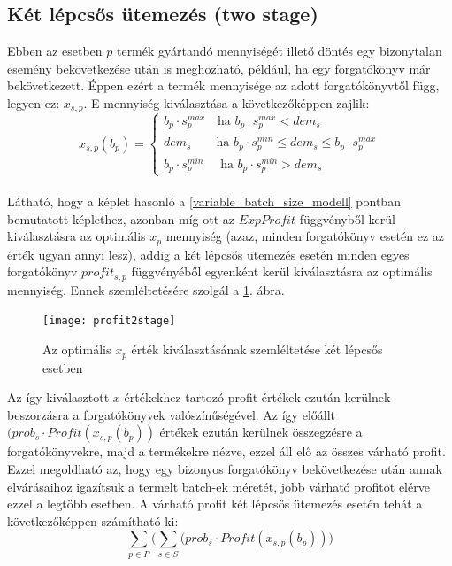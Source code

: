 \subsection{Két lépcsős ütemezés (two stage)} \label{TwoStage}
Ebben az esetben $p$ termék gyártandó mennyiségét illető döntés egy bizonytalan esemény bekövetkezése után is meghozható, például, ha egy forgatókönyv már bekövetkezett.
Éppen ezért a termék mennyisége az adott forgatókönyvtől függ, legyen ez: $x_{s,p}$. E mennyiség kiválasztása a következőképpen zajlik:
\begin{equation*}
x_{s,p}(b_p)= \begin{cases}
            b_p \cdot s_p^{max} \quad \text{ha } b_p \cdot s_p^{max}<dem_{s}\\
            dem_{s} \qquad \text{ha } b_p \cdot s_p^{min} \leq dem_{s} \leq b_p \cdot s_p^{max}\\
            b_p \cdot s_p^{min} \quad \text{ ha } b_p \cdot s_p^{min}>dem_{s}
       \end{cases}       
\end{equation*}\\
Látható, hogy a képlet hasonló a \ref{variable_batch_size_modell} pontban bemutatott képlethez, azonban míg ott  az $ExpProfit$ függvényből kerül kiválasztásra az optimális $x_p$ mennyiség (azaz, minden forgatókönyv esetén ez az érték ugyan annyi lesz), addig a két lépcsős ütemezés esetén minden egyes forgatókönyv $profit_{s,p}$ függvényéből egyenként kerül kiválasztásra az optimális mennyiség.
Ennek szemléltetésére szolgál a \ref{profit_2stage}. ábra.
\begin{figure}[H]
\begin{center}
\texttt{[image: profit2stage]}
\caption{Az optimális $x_p$ érték kiválasztásának szemléltetése két lépcsős esetben}
\label{profit_2stage}
\end{center}
\end{figure}
Az így kiválasztott $x$ értékekhez tartozó profit értékek ezután kerülnek beszorzásra a forgatókönyvek valószínűségével.
Az így előállt $(prob_s \cdot Profit(x_{s,p}(b_p))$ értékek ezután kerülnek összegzésre a forgatókönyvekre, majd a termékekre nézve, ezzel áll elő az összes várható profit.
Ezzel megoldható az, hogy egy bizonyos forgatókönyv bekövetkezése után annak elvárásaihoz igazítsuk a termelt batch-ek méretét, jobb várható profitot elérve ezzel a legtöbb esetben.
A várható profit két lépcsős ütemezés esetén tehát a következőképpen számítható ki:
$$\sum_{p \in P} \bigg( \sum_{s \in S}(prob_s \cdot Profit(x_{s,p}(b_p)) \bigg)$$ 

